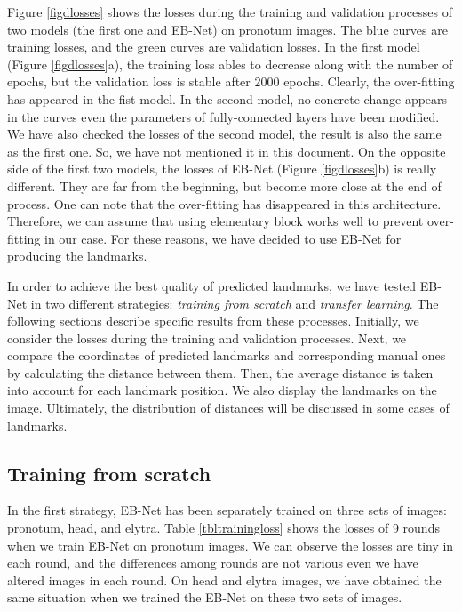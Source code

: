 \documentclass[review]{elsarticle}
\begin{document}
Figure \ref{figdlosses} shows the losses during the training and validation processes of two models (the first one and EB-Net) on pronotum images. The blue curves are training losses, and the green curves are validation losses. In the first model (Figure \ref{figdlosses}a), the training loss ables to decrease along with the number of epochs, but the validation loss is stable after $2000$ epochs. Clearly, the over-fitting has appeared in the fist model. In the second model, no concrete change appears in the curves even the parameters of fully-connected layers have been modified. We have also checked the losses of the second model, the result is also the same as the first one. So, we have not mentioned it in this document. On the opposite side of the first two models, the losses of EB-Net (Figure \ref{figdlosses}b) is really different. They are far from the beginning, but become more close at the end of process. One can note that the over-fitting has disappeared in this architecture. Therefore, we can assume that using elementary block works well to prevent over-fitting in our case. For these reasons, we have decided to use EB-Net for producing the landmarks.

In order to achieve the best quality of predicted landmarks, we have tested EB-Net in two different strategies: \textit{training from scratch} and \textit{transfer learning}. The following sections describe specific results from these processes. Initially, we consider the losses during the training and validation processes. Next, we compare the coordinates of predicted landmarks and corresponding manual ones by calculating the distance between them. Then, the average distance is taken into account for each landmark position. We also display the landmarks on the image. Ultimately, the distribution of distances will be discussed in some cases of landmarks. 

\subsection{Training from scratch}
In the first strategy, EB-Net has been separately trained on three sets of images: pronotum, head, and elytra. Table \ref{tbltrainingloss} shows the losses of 9 rounds when we train EB-Net on pronotum images. We can observe the losses are tiny in each round, and the differences among rounds are not various even we have altered images in each round. On head and elytra images, we have obtained the same situation when we trained the EB-Net on these two sets of images.
\end{document}
